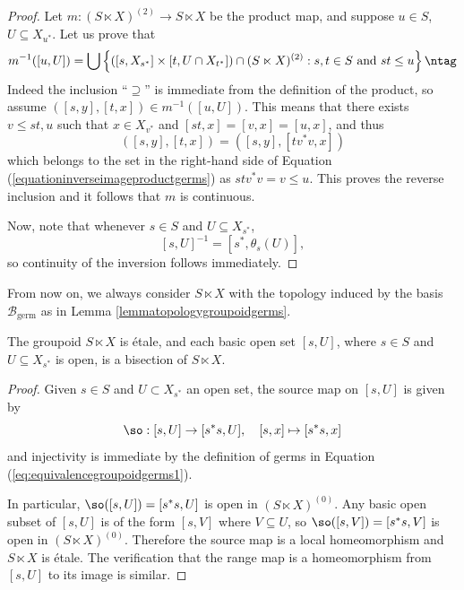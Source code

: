 \begin{proof}
Let $m:(S\ltimes X)^{(2)}\to S\ltimes X$ be the product map, and suppose $u\in S$, $U\subseteq X_{u^*}$. Let us prove that
\[m^{-1}([u,U])=\bigcup\left\{([s,X_{s^*}]\times [t,U\cap X_{t^*}])\cap (S\ltimes X)^{(2)}:s,t\in S\text{ and }st\leq u\right\}\ntag\label{equationinverseimageproductgerms}\]
Indeed the inclusion ``$\supseteq$'' is immediate from the definition of the product, so assume $([s,y],[t,x])\in m^{-1}([u,U])$. 
This means that there exists $v\leq st,u$ such that $x\in X_{v^*}$ and $[st,x]=[v,x]=[u,x]$, and thus
\[([s,y],[t,x])=([s,y],[tv^*v,x])\]
which belongs to the set in the right-hand side of Equation (\ref{equationinverseimageproductgerms}) as $stv^*v=v\leq u$. This proves the reverse inclusion and it follows that $m$ is continuous.


Now, note that whenever $s\in S$ and $U\subseteq X_{s^*}$,
\[[s,U]^{-1}=[s^*,\theta_s(U)],\]
so continuity of the inversion follows immediately.
\end{proof}

From now on, we always consider $S\ltimes X$ with the topology induced by the basis $\mathcal{B}_{\mathrm{germ}}$ as in Lemma \ref{lemmatopologygroupoidgerms}.%

\begin{proposition}\label{prop:bisectionhomeomorphic}
The groupoid $S\ltimes X$ is étale, and each basic open set $[s,U]$, where $s\in S$ and $U\subseteq X_{s^*}$ is open, is a bisection of $S\ltimes X$.
\end{proposition}
\begin{proof}
Given $s \in S$ and $U \subset X_{s^*}$ an open set, the source map on $[s,U]$ is given by
\[\so:[s,U]\to[s^*s,U],\quad [s,x]\mapsto[s^*s,x]\]
and injectivity is immediate by the definition of germs in Equation (\ref{eq:equivalencegroupoidgerms1}).

In particular, $\so([s,U])=[s^*s,U]$ is open in $(S\ltimes X)^{(0)}$. Any basic open subset of $[s,U]$ is of the form $[s,V]$ where $V\subseteq U$, so $\so([s,V])=[s^*s,V]$ is open in $(S\ltimes X)^{(0)}$. Therefore the source map is a local homeomorphism and $S\ltimes X$ is étale. The verification that the range map is a homeomorphism from $[s,U]$ to its image is similar.\qedhere
\end{proof}

